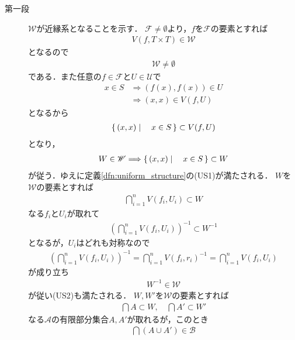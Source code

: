 	\begin{sketch}\mbox{}
		\begin{description}
			\item[第一段] $\mathscr{W}$が近縁系となることを示す．
				$\mathscr{F} \neq \emptyset$より，$f$を$\mathscr{F}$の要素とすれば
				\begin{align}
					V(f,T \times T) \in \mathscr{W}
				\end{align}
				となるので
				\begin{align}
					\mathscr{W} \neq \emptyset
				\end{align}
				である．また任意の$f \in \mathscr{F}$と$U \in \mathscr{U}$で
				\begin{align}
					x \in S &\Longrightarrow (f(x),f(x)) \in U \\
					&\Longrightarrow (x,x) \in V(f,U)
				\end{align}
				となるから
				\begin{align}
					\left\{\, (x,x) \mid \quad x \in S\, \right\} \subset V(f,U)
				\end{align}
				となり，
				\begin{align}
					W \in \mathscr{W} \Longrightarrow \left\{\, (x,x) \mid \quad x \in S\, \right\} \subset W
				\end{align}
				が従う．ゆえに定義\ref{dfn:uniform_structure}の(US1)が満たされる．
				$W$を$\mathscr{W}$の要素とすれば
				\begin{align}
					\bigcap_{i=1}^n V(f_i,U_i) \subset W
				\end{align}
				なる$f_i$と$U_i$が取れて
				\begin{align}
					\left(\bigcap_{i=1}^n V(f_i,U_i)\right)^{-1} \subset W^{-1}
				\end{align}
				となるが，$U_i$はどれも対称なので
				\begin{align}
					\left(\bigcap_{i=1}^n V(f_i,U_i)\right)^{-1}
					= \bigcap_{i=1}^n V(f_i,r_i)^{-1}
					= \bigcap_{i=1}^n V(f_i,U_i)
				\end{align}
				が成り立ち
				\begin{align}
					W^{-1} \in \mathscr{W}
				\end{align}
				が従い(US2)も満たされる．
				$W,W'$を$\mathscr{W}$の要素とすれば
				\begin{align}
					\bigcap A \subset W,\quad
					\bigcap A' \subset W'
				\end{align}
				なる$\mathscr{A}$の有限部分集合$A,A'$が取れるが，このとき
				\begin{align}
					\bigcap (A \cup A') \in \mathscr{B}
				\end{align}

\end{description}
\end{sketch}
